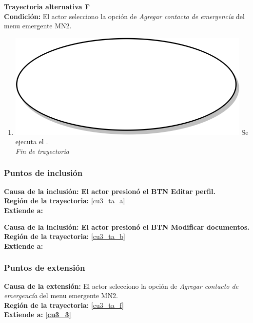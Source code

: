 \textbf{Trayectoria alternativa F} \label{cu3_ta_f} \\
\textbf{Condición:} El actor selecciono la opción de \textit{Agregar contacto de emergencía} del menu emergente MN2. \\
 \begin{enumerate}[label=F\arabic*]
    \item {\includegraphics[scale=.05]{Capitulo3/img/proceso.png} Se ejecuta el \textbf{}.} \\
    \textit{Fin de trayectoria} \\
\end{enumerate}

\subsubsection{Puntos de inclusión}
\noindent \textbf{Causa de la inclusión: El actor presionó el BTN Editar perfil.} \\
\textbf{Región de la trayectoria:} \ref{cu3_ta_a}\\
\textbf{Extiende a:} \textbf{}

\noindent \textbf{Causa de la inclusión: El actor presionó el BTN Modificar documentos.} \\
\textbf{Región de la trayectoria:} \ref{cu3_ta_b} \\
\textbf{Extiende a:} \textbf{}

\subsubsection{Puntos de extensión}
\noindent \textbf{Causa de la extensión:} El actor selecciono la opción de \textit{Agregar contacto de emergencía} del menu emergente MN2. \\
\textbf{Región de la trayectoria:} \ref{cu3_ta_f} \\
\textbf{Extiende a:} \textbf{\ref{cu3_3}}
